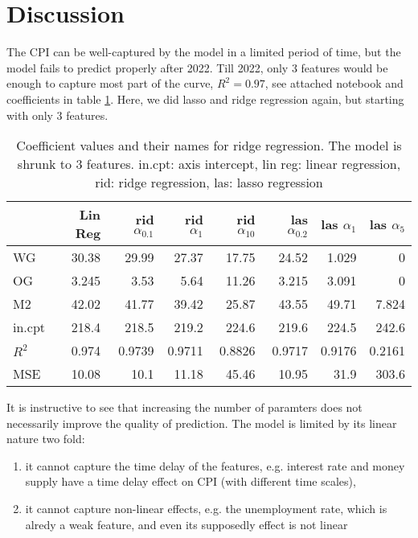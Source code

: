 \documentclass{article}
\begin{document}
\section*{Discussion}
The CPI can be well-captured by the model in a limited period of time,
but the model fails to predict properly after 2022. Till 2022,
only 3 features would be enough to capture most part of the curve,
$R^2 = 0.97$, see attached notebook and coefficients in table \ref{tab:ridge_coefficients_small}.
Here, we did lasso and ridge regression again, but starting with only 3 features.

\begin{table}
      \caption{Coefficient values and their names for ridge regression.
            The model is shrunk to 3 features.
            in.cpt: axis intercept, lin reg: linear regression, rid: ridge regression, las: lasso regression}
      \label{tab:ridge_coefficients_small}
      \begin{tabular}{lrrrrrrr}
            \toprule
                   & Lin Reg & rid $\alpha_{0.1}$ & rid $\alpha_{1}$ & rid $\alpha_{10}$ & las $\alpha_{0.2}$ & las $\alpha_{1}$ & las $\alpha_{5}$ \\
            \midrule
            WG     & 30.38   & 29.99              & 27.37            & 17.75             & 24.52              & 1.029            & 0                \\
            OG     & 3.245   & 3.53               & 5.64             & 11.26             & 3.215              & 3.091            & 0                \\
            M2     & 42.02   & 41.77              & 39.42            & 25.87             & 43.55              & 49.71            & 7.824            \\
            in.cpt & 218.4   & 218.5              & 219.2            & 224.6             & 219.6              & 224.5            & 242.6            \\
            $R^2$  & 0.974   & 0.9739             & 0.9711           & 0.8826            & 0.9717             & 0.9176           & 0.2161           \\
            MSE    & 10.08   & 10.1               & 11.18            & 45.46             & 10.95              & 31.9             & 303.6            \\
            \bottomrule
      \end{tabular}
\end{table}


It is instructive to see that increasing the number of paramters
does not necessarily improve the quality of prediction.
The model is limited by its linear nature two fold:
\begin{enumerate}
      \item it cannot capture the time delay of the features,
            e.g. interest rate and money supply have a
            time delay effect on CPI (with different time scales),
      \item it cannot capture non-linear effects, e.g. the unemployment rate,
            which is alredy a weak feature,
            and even its supposedly effect is not linear
\end{enumerate}
\end{document}
